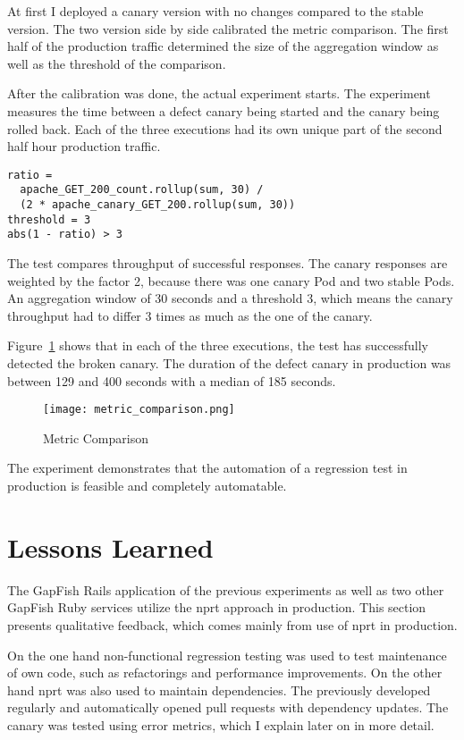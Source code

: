 At first I deployed a canary version with no changes compared to the stable version. The
two version side by side calibrated the metric comparison. The first half of the
production traffic determined the size of the aggregation window as well as the threshold
of the comparison.

After the calibration was done, the actual experiment starts. The experiment measures the
time between a defect canary being started and the canary being rolled back. Each
of the three executions had its own unique part of the second half hour production traffic.

\begin{verbatim}
ratio =
  apache_GET_200_count.rollup(sum, 30) /
  (2 * apache_canary_GET_200.rollup(sum, 30))
threshold = 3
abs(1 - ratio) > 3
\end{verbatim}

The test compares throughput of successful responses. The canary responses are weighted by
the factor 2, because there was one canary Pod and two stable Pods. An aggregation window
of 30 seconds and a threshold 3, which means the canary throughput had to differ 3 times
as much as the one of the canary.

Figure~\ref{fig:metric_comparison} shows that in each of the three executions, the test
has successfully detected the broken canary. The duration of the defect canary in
production was between 129 and 400 seconds with a median of 185 seconds.

\begin{figure}[htbp]
  \centering
  \texttt{[image: metric\_comparison.png]}
  \caption{Metric Comparison}
  \label{fig:metric_comparison}
\end{figure}

The experiment demonstrates that the automation of a regression test in production is
feasible and completely automatable.

\section{Lessons Learned}

The GapFish Rails application of the previous experiments as well as two other
GapFish Ruby services utilize the \gls{nprt} approach in production. This section presents
qualitative feedback, which comes mainly from use of \gls{nprt} in production.

On the one hand non-functional regression testing was used to test maintenance of own code,
such as refactorings and performance improvements. On the other hand \gls{nprt} was also
used to maintain dependencies. The previously developed \gemupdater regularly and
automatically opened pull requests with dependency updates. The canary was tested using
error metrics, which I explain later on in more detail.

